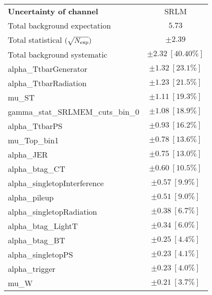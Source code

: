 
\begin{table}
\begin{center}
\setlength{\tabcolsep}{0.0pc}
\begin{tabular*}{\textwidth}{@{\extracolsep{\fill}}lc}
\noalign{\smallskip}\hline\noalign{\smallskip}
{\bf Uncertainty of channel}                                    & SRLM          \\
\noalign{\smallskip}\hline\noalign{\smallskip}
Total background expectation             &  $5.73$       \\
\noalign{\smallskip}\hline\noalign{\smallskip}
Total statistical $(\sqrt{N_{\rm exp}})$              & $\pm 2.39$       \\
Total background systematic               & $\pm 2.32\ [40.40\%] $             \\
\noalign{\smallskip}\hline\noalign{\smallskip}
\noalign{\smallskip}\hline\noalign{\smallskip}
alpha\_TtbarGenerator         & $\pm 1.32\ [23.1\%] $       \\
alpha\_TtbarRadiation         & $\pm 1.23\ [21.5\%] $       \\
mu\_ST         & $\pm 1.11\ [19.3\%] $       \\
gamma\_stat\_SRLMEM\_cuts\_bin\_0         & $\pm 1.08\ [18.9\%] $       \\
alpha\_TtbarPS         & $\pm 0.93\ [16.2\%] $       \\
mu\_Top\_bin1         & $\pm 0.78\ [13.6\%] $       \\
alpha\_JER         & $\pm 0.75\ [13.0\%] $       \\
alpha\_btag\_CT         & $\pm 0.60\ [10.5\%] $       \\
alpha\_singletopInterference         & $\pm 0.57\ [9.9\%] $       \\
alpha\_pileup         & $\pm 0.51\ [9.0\%] $       \\
alpha\_singletopRadiation         & $\pm 0.38\ [6.7\%] $       \\
alpha\_btag\_LightT         & $\pm 0.34\ [6.0\%] $       \\
alpha\_btag\_BT         & $\pm 0.25\ [4.4\%] $       \\
alpha\_singletopPS         & $\pm 0.23\ [4.1\%] $       \\
alpha\_trigger         & $\pm 0.23\ [4.0\%] $       \\
mu\_W         & $\pm 0.21\ [3.7\%] $       \\

\end{tabular*}
\end{center}
\end{table}
